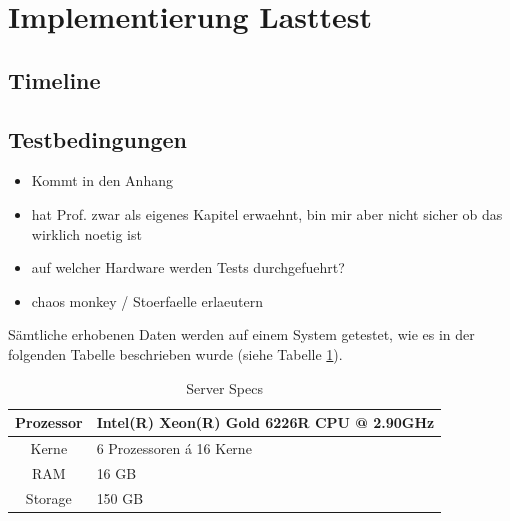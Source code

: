 \section{Implementierung Lasttest}
\subsection{Timeline}
\subsection{Testbedingungen}
\begin{itemize}
  \item Kommt in den Anhang
  \item hat Prof. zwar als eigenes Kapitel erwaehnt, bin mir aber nicht sicher ob das wirklich noetig ist
  \item auf welcher Hardware werden Tests durchgefuehrt?
  \item chaos monkey / Stoerfaelle erlaeutern
\end{itemize}


Sämtliche erhobenen Daten werden auf einem System getestet, wie es in der folgenden Tabelle beschrieben wurde (siehe Tabelle \ref{tab:serverSpecs}).


\begin{table}[ht!]
  \centering
  \caption{Server Specs}
  \label{tab:serverSpecs}
  \bigskip
  \begin{tabular}{ c l }
    \toprule
    Prozessor & Intel(R) Xeon(R) Gold 6226R CPU @ 2.90GHz \\
    \midrule
    Kerne & 6 Prozessoren á 16 Kerne \\
    \midrule
    RAM & 16 GB \\
    \midrule
    Storage & 150 GB \\
    \bottomrule
  \end{tabular}
\end{table}

